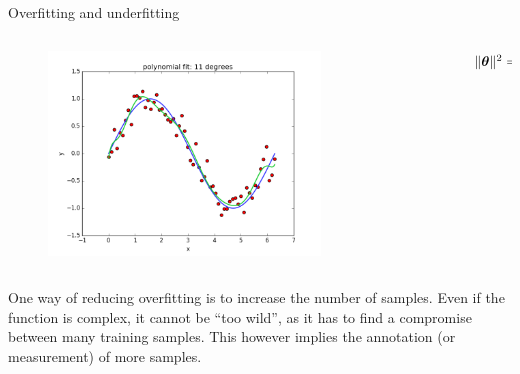 \documentclass[xcolor=pdftex,dvipsnames,table,mathserif]{beamer}
\begin{document}
\begin{frame}{Overfitting and underfitting}
\begin{columns}
\begin{column}{.8\textwidth}
\begin{figure}[htb]
	\includegraphics[width=0.75\textwidth]{../graphics/polyfit_degree_11_N60.png}
\end{figure}
\end{column}
\begin{column}{.2\textwidth}
$\| \boldsymbol{\theta} \|^2 = 5647$
\end{column}
\end{columns}
One way of reducing overfitting is to increase the number of samples. Even if the function is complex, it cannot be “too wild”, as it has to find a compromise between many training samples. This however implies the annotation (or measurement) of more samples.
\end{frame}
\end{document}
